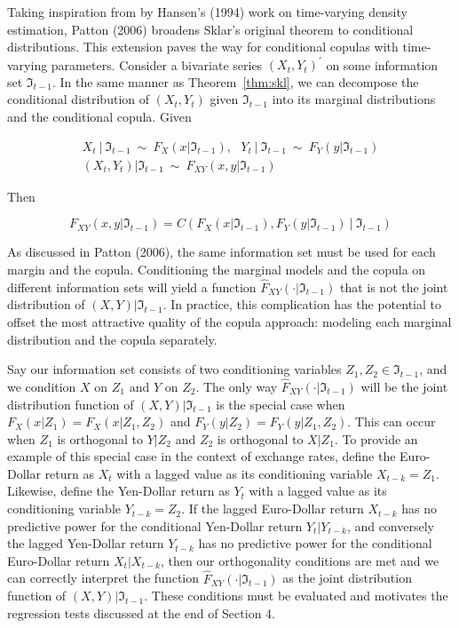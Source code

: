 \documentclass[12pt]{article}
\begin{document}
Taking inspiration from by Hansen's (1994) work on time-varying density
estimation, Patton (2006) broadens Sklar's original theorem to conditional
distributions. This extension paves the way for conditional copulas with
time-varying parameters. Consider a bivariate series
$\left(X_{t},Y_{t}\right)^{\prime}$ on some information set $\Im_{t-1}$.
In the same manner as Theorem~\ref{thm:skl}, we can decompose the conditional
distribution of $\left(X_{t},Y_{t}\right)$ given $\Im _{t-1}$ into its
marginal distributions and the conditional copula. Given 

\begin{gather*}
X_{t}~|~\Im _{t-1}~\sim~F_{X}\left(x|\Im_{t-1}\right), ~~~ Y_{t}~|~\Im_{t-1}~\sim ~ F_{Y}\left(y|\Im_{t-1}\right) \\ \left(X_{t},Y_{t}\right) | \Im _{t-1}~ \sim ~ F_{XY}\left(x,y|\Im_{t-1}\right) 
\end{gather*}

Then

\begin{equation} \label{eqn:patton}
F_{XY}\left(x,y| \Im_{t-1}\right) = C\left(F_{X}\left(x| \Im_{t-1}\right)
,F_{Y}\left(y| \Im_{t-1}\right) ~|~ \Im_{t-1}\right)
\end{equation}

As discussed in Patton (2006), the same information set must be used for
each margin and the copula. Conditioning the marginal models and the copula
on different information sets will yield a function
$\hat{F}_{XY}\left(\cdot|\Im_{t-1}\right)$ that is not the joint distribution
of $\left(X,Y\right)|\Im_{t-1}$. In practice, this complication has the
potential to offset the most attractive quality of the copula approach:
modeling each marginal distribution and the copula separately.

Say our information set consists of two conditioning variables
$Z_{1},Z_{2}\in\Im_{t-1}$, and we condition $X$ on $Z_{1}$ and $Y$ on
$Z_{2}$. The only way $\hat{F}_{XY}\left(\cdot|\Im_{t-1}\right)$ will be
the joint distribution function of $\left(X,Y\right)|\Im_{t-1}$ is the
special case when $F_{X}\left(x|Z_{1}\right) = F_{X}\left(x|Z_{1},Z_{2}\right)$
and $F_{Y}\left(y|Z_{2}\right) = F_{Y}\left(y|Z_{1},Z_{2}\right)$. This
can occur when $Z_{1}$ is orthogonal to $Y|Z_{2}$ and $Z_{2}$ is orthogonal
to $X|Z_{1}$. To provide an example of this special case in the context of
exchange rates, define the Euro-Dollar return as $X_{t}$ with a lagged
value as its conditioning variable $X_{t-k} = Z_{1}$. Likewise, define the
Yen-Dollar return as $Y_{t}$ with a lagged value as its conditioning
variable $Y_{t-k} = Z_{2}$. If the lagged Euro-Dollar return $X_{t-k}$
has no predictive power for the conditional Yen-Dollar return
$Y_{t}|Y_{t-k}$, and conversely the lagged Yen-Dollar return $Y_{t-k}$ has
no predictive power for the conditional Euro-Dollar return $X_{t}|X_{t-k}$,
then our orthogonality conditions are met and we can correctly interpret
the function $\hat{F}_{XY}\left(\cdot|\Im_{t-1}\right)$ as the joint
distribution function of $\left(X,Y\right)|\Im _{t-1}$. These conditions
must be evaluated and motivates the regression tests discussed at the end
of Section 4.
\end{document}
